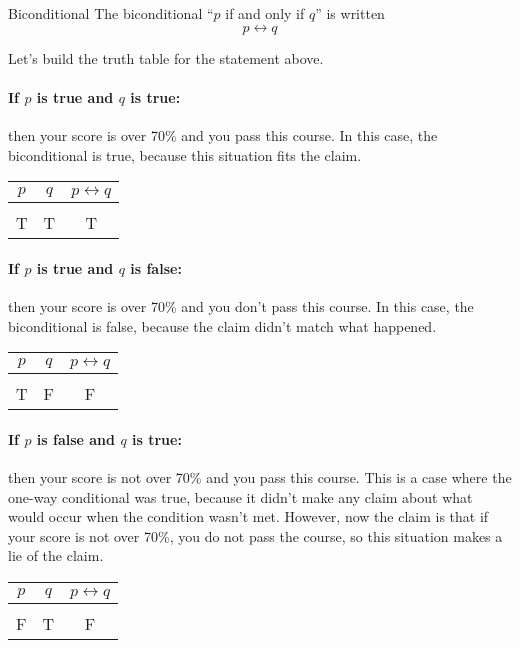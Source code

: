 \begin{proc}{Biconditional}
The biconditional ``$p$ if and only if $q$'' is written \[p \leftrightarrow q\]
\end{proc}

Let's build the truth table for the statement above.

\paragraph{If $p$ is true and $q$ is true:} then your score is over 70\% and you pass this course.  In this case, the biconditional is true, because this situation fits the claim.
\begin{center}
\begin{tabular}{c c c}
$p$ & $q$ & $p \leftrightarrow q$\\
\hline
& & \\
T & T & T
\end{tabular}
\end{center}

\paragraph{If $p$ is true and $q$ is false:} then your score is over 70\% and you don't pass this course.  In this case, the biconditional is false, because the claim didn't match what happened.
\begin{center}
\begin{tabular}{c c c}
$p$ & $q$ & $p \leftrightarrow q$\\
\hline
& & \\
T & F & F
\end{tabular}
\end{center}

\paragraph{If $p$ is false and $q$ is true:} then your score is not over 70\% and you pass this course.  This is a case where the one-way conditional was true, because it didn't make any claim about what would occur when the condition wasn't met.  However, now the claim is that if your score is not over 70\%, you do not pass the course, so this situation makes a lie of the claim.
\begin{center}
\begin{tabular}{c c c}
$p$ & $q$ & $p \leftrightarrow q$\\
\hline
& & \\
F & T & F
\end{tabular}
\end{center}

